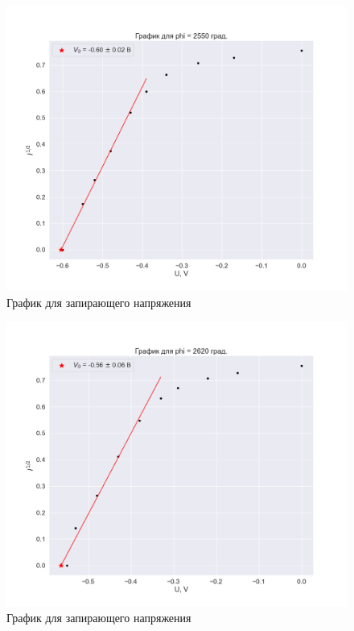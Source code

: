 \documentclass[a4paper, 12pt]{article}
\begin{document}
\begin{figure}[H]
    \centering
    \includegraphics[width=1\textwidth]{plot_zero6.png}
    \caption{График для запирающего напряжения}
\end{figure}

\begin{figure}[H]
    \centering
    \includegraphics[width=1\textwidth]{plot_zero7.png}
    \caption{График для запирающего напряжения}
\end{figure}
\end{document}
